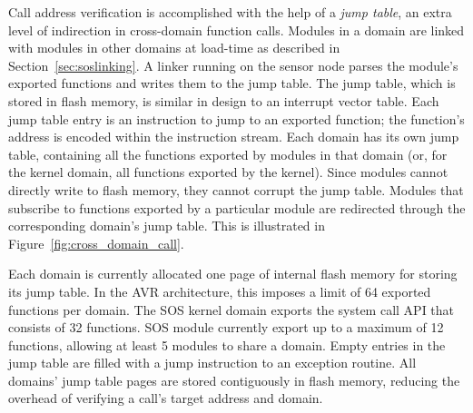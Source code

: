 %
Call address verification is accomplished with the help of a \emph{jump
table}, an extra level of indirection in cross-domain function calls.
%
%
Modules in a domain are linked with modules in other domains at
load-time as described in Section~\ref{sec:soslinking}.
%
A linker running on the sensor node parses the module's exported functions
and writes them to the jump table.
%
The jump table, which is stored in flash memory, is similar in design
to an interrupt vector table.
%
Each jump table entry is an instruction to jump to an exported
function;
%
the function's address is encoded within the instruction stream.
%
Each domain has its own jump table, containing all the functions exported
by modules in that domain (or, for the kernel domain, all functions
exported by the kernel).
%
Since modules cannot directly write to flash memory, they cannot
corrupt the jump table.
%
Modules that subscribe to functions exported by a particular module
are redirected through the corresponding domain's jump table.
%
This is illustrated in Figure~\ref{fig:cross_domain_call}.
%
%

Each domain is currently allocated one page of internal flash memory for
storing its jump table.
%
%
In the AVR architecture, this imposes a limit of 64 exported functions per
domain.
%
The SOS kernel domain exports the system call API that consists of 32
functions.
%
SOS module currently export up to a maximum of 12 functions, allowing
at least 5 modules to share a domain.
%
Empty entries in the jump table are filled with a jump instruction to an
exception routine.
%
All domains' jump table pages are stored contiguously in flash memory,
reducing the overhead of verifying a call's target address and domain.



